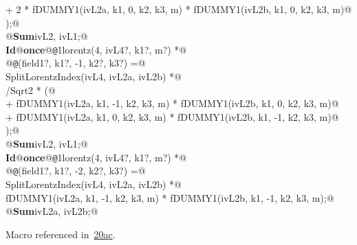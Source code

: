 \documentclass[a4paper,12pt]{amsart}
\renewcommand{\NWlink}[2]{\hyperlink{#1}{#2}}
\renewcommand{\NWtxtMacroRefIn}{Macro referenced in}
\renewcommand{\NWsep}{${\diamond}$}
\begin{document}
\begin{flushleft}
\begin{list}{}{}
\mbox{}\verb@      + 2 * fDUMMY1(ivL2a, k1, 0, k2, k3, m) * fDUMMY1(ivL2b, k1, 0, k2, k3, m)@\\
\mbox{}\verb@   );@\\
\mbox{}\verb@   @\hbox{\sffamily\bfseries Sum}\verb@ ivL2, ivL1;@\\
\mbox{}\verb@@\hbox{\sffamily\bfseries Id}\verb@ @\hbox{\sffamily\bfseries once}\verb@ @{\tt @}\verb@1lorentz(4, ivL4?, k1?, m?) *@\\
\mbox{}\verb@      @{\tt @}(field1?, k1?, -1, k2?, k3?) =@\\
\mbox{}\verb@   SplitLorentzIndex(ivL4, ivL2a, ivL2b) *@\\
\mbox{}/Sqrt2 * (@\\
\mbox{}\verb@      + fDUMMY1(ivL2a, k1, -1, k2, k3, m) * fDUMMY1(ivL2b, k1,  0, k2, k3, m)@\\
\mbox{}\verb@      + fDUMMY1(ivL2a, k1,  0, k2, k3, m) * fDUMMY1(ivL2b, k1, -1, k2, k3, m)@\\
\mbox{}\verb@   );@\\
\mbox{}\verb@   @\hbox{\sffamily\bfseries Sum}\verb@ ivL2, ivL1;@\\
\mbox{}\verb@@\hbox{\sffamily\bfseries Id}\verb@ @\hbox{\sffamily\bfseries once}\verb@ @{\tt @}\verb@1lorentz(4, ivL4?, k1?, m?) *@\\
\mbox{}\verb@      @{\tt @}(field1?, k1?, -2, k2?, k3?) =@\\
\mbox{}\verb@   SplitLorentzIndex(ivL4, ivL2a, ivL2b) *@\\
\mbox{}\verb@   fDUMMY1(ivL2a, k1, -1, k2, k3, m) * fDUMMY1(ivL2b, k1, -1, k2, k3, m);@\\
\mbox{}\verb@   @\hbox{\sffamily\bfseries Sum}\verb@ ivL2a, ivL2b;@\\
\mbox{}\verb@@{\NWsep}
\end{list}
\vspace{-1.5ex}
\footnotesize
\begin{list}{}{\setlength{\itemsep}{-\parsep}\setlength{\itemindent}{-\leftmargin}}
\item \NWtxtMacroRefIn\ \NWlink{nuweb20a}{20a}\NWlink{nuweb20c}{c}.

\item{}
\end{list}
\vspace{4ex}
\end{flushleft}
\end{document}
